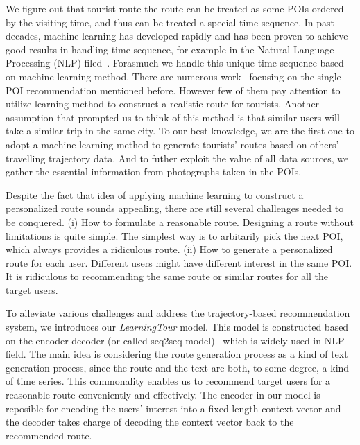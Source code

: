 \documentclass[runningheads]{llncs}
\begin{document}
We figure out that tourist route the route can be treated as some POIs ordered by the visiting time, and thus can be treated a special time sequence. In past decades, machine learning has developed rapidly and has been proven to achieve good results in handling time sequence, for example in the Natural Language Processing (NLP) filed~\cite{DBLP:conf/acl/CohnHB18}. Forasmuch we handle this unique time sequence based on machine learning method. There are numerous work~\cite{Liu:2017:EEP:3115404.3115407} focusing on the single POI recommendation mentioned before. However few of them pay attention to utilize learning method to construct a realistic route for tourists. Another assumption that prompted us to think of this method is that similar users will take a similar trip in the same city. To our best knowledge, we are the first one to adopt a machine learning method to generate tourists' routes based on others' travelling trajectory data. And to futher exploit the value of all data sources, we gather the essential information from photographs taken in the POIs.

Despite the fact that idea of applying machine learning to construct a personalized route sounds appealing, there are still several challenges needed to be conquered. (i) How to formulate a reasonable route. Designing a route without limitations is quite simple. The simplest way is to arbitarily pick the next POI, which always provides a ridiculous route. (ii) How to generate a personalized route for each user. Different users might have different interest in the same POI. It is ridiculous to recommending the same route or similar routes for all the target users.

To alleviate various challenges and address the trajectory-based recommendation system, we introduces our \emph{LearningTour}  model. This model is constructed based on the encoder-decoder (or called seq2seq model)~\cite{DBLP:conf/nips/SutskeverVL14} which is widely used in NLP field. The main idea is considering the route generation process as a kind of text generation process, since the route and the text are both, to some degree, a kind of time series. This commonality enables us to recommend target users for a reasonable route conveniently and effectively. The encoder in our model is reposible for encoding the users' interest into a fixed-length context vector and the decoder takes charge of decoding the context vector back to the recommended route.
\end{document}
